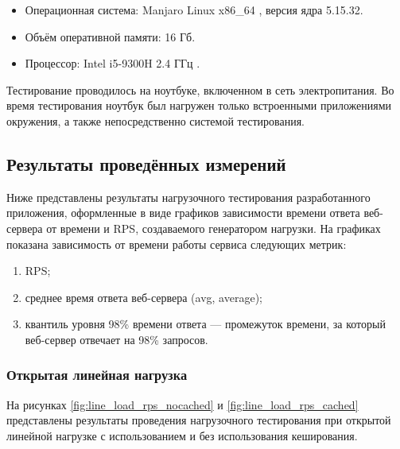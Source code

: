 \begin{itemize}[label*=---]
	\item Операционная система: Manjaro Linux x86\_64 \cite{manjaro}, версия ядра 5.15.32.
	\item Объём оперативной памяти: 16 Гб.
	\item Процессор: Intel i5-9300H 2.4 ГГц \cite{intel}.
\end{itemize}

Тестирование проводилось на ноутбуке, включенном в сеть электропитания. Во время тестирования ноутбук был нагружен только встроенными приложениями окружения, а также непосредственно системой тестирования.


		
\subsection{Результаты проведённых измерений}

Ниже представлены результаты нагрузочного тестирования разработанного приложения, оформленные в виде графиков зависимости времени ответа веб-сервера от времени и RPS, создаваемого генератором нагрузки. На графиках показана зависимость от времени работы сервиса следующих метрик:

\begin{enumerate}[label*=\arabic*)]
	\item RPS;
	\item среднее время ответа веб-сервера (avg, average);
	\item квантиль уровня 98\% времени ответа --- промежуток времени, за который веб-сервер отвечает на 98\% запросов.
\end{enumerate}


\subsubsection{Открытая линейная нагрузка}

На рисунках \ref{fig:line_load_rps_nocached} и \ref{fig:line_load_rps_cached} представлены результаты проведения нагрузочного тестирования при открытой линейной нагрузке с использованием и без использования кеширования.

